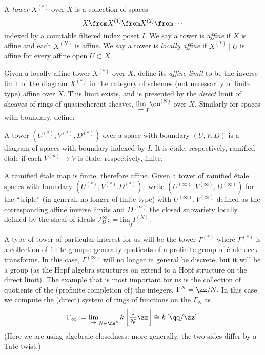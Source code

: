\documentclass{article}
\newcommand{\I}{\mathcal{I}}
\newcommand{\dirlim}{\underset{\to}{\text{lim}}}
\begin{document}
\begin{defi}
  A \emph{tower} $X^{(*)}$ over $X$ is a collection of spaces $$X\from X^{(1)}\from X^{(2)}\from \cdots$$ indexed by a countable filtered index poset $I$. We say a tower is \emph{affine} if $X$ is affine and each $X^{(N)}$ is affine. We say a tower is \emph{locally affine} if $X^{(*)}\mid U$ is affine for every affine open $U\subset X$. 
\end{defi}
Given a locally affine tower $X^{(*)}$ over $X$, define its \emph{affine limit} to be the inverse limit of the diagram $X^{(*)}$ in the category of schemes (not necessarily of finite type) affine over $X$. This limit exists, and is presented by the \emph{direct} limit of sheaves of rings of quasicoherent sheaves, $\dirlim_I \oo^{(N)}$ over $X$. Similarly for spaces with boundary, define:
\begin{defi}
  A tower $(U^{(*)}, V^{(*)}, D^{(*)})$ over a space with boundary $(U, V, D)$ is a diagram of spaces with boundary indexed by $I$. It is \'etale, respectively, ramified \'etale if each $V^{(n)}\to V$ is \'etale, respectively, finite.
\end{defi}
A ramified \'etale map is finite, therefore affine. Given a tower of ramified \'etale spaces with boundary $(U^{(*)}, V^{(*)}. D^{(*)}),$ write $(U^{(\infty)}, V^{(\infty)}, D^{(\infty)})$ for the ``triple'' (in general, no longer of finite type) with $U^{(\infty)}, V^{(\infty)}$ defined as the corresponding affine inverse limits and $D^{(\infty)}$ the closed subvariety locally defined by the sheaf of ideals $\I_D^\infty: = \dirlim_I I^{(N)}.$ 

A type of tower of particular interest for us will be the tower $\Gamma^{(*)}$ where $\Gamma^{(*)}$ is a collection of finite groups: generally quotients of a profinite group of \'etale deck transforms. In this case, $\Gamma^{(\infty)}$ will no longer in general be discrete, but it will be a group (as the Hopf algebra structures on extend to a Hopf structure on the direct limit). The example that is most important for us is the collection of quotients of the (profinite completion of) the integers, $\Gamma^N = \zz/N.$ In this case we compute the (direct) system of rings of functions on the $\Gamma_N$ as $$\Gamma_\infty : = \dirlim_{N\in \nn^\times} k\left[\frac{1}{N}\zz\right]\cong k\left[\qq/\zz\right].$$ (Here we are using algebraic closedness: more generally, the two sides differ by a Tate twist.) 
\end{document}
